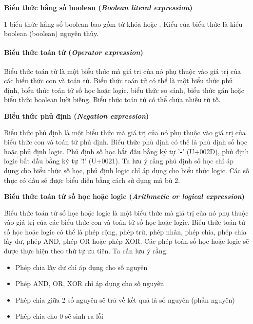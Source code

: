 \noindent\textbf{Biểu thức hằng số boolean (\textit{Boolean literal expression})}

1 biểu thức hằng số boolean bao gồm từ khóa  hoặc . Kiểu của biểu thức là kiểu boolean (boolean) nguyên thủy.

\paragraph{Biểu thức toán tử (\textit{Operator expression})}

\regexopexpr

Biểu thức toán tử là một biểu thức mà giá trị của nó phụ thuộc vào giá trị của các biểu thức con và toán tử. Biểu thức toán tử có thể là một biểu thức phủ định, biểu thức toán tử số học hoặc logic, biểu thức so sánh, biểu thức gán hoặc biểu thức boolean lười biếng. Biểu thức toán tử có thể chứa nhiều từ tố.

\noindent\textbf{Biểu thức phủ định (\textit{Negation expression})}

\regexneexpr

Biểu thức phủ định là một biểu thức mà giá trị của nó phụ thuộc vào giá trị của biểu thức con và toán tử phủ định. Biểu thức phủ định có thể là phủ định số học hoặc phủ định logic. Phủ định số học bắt đầu bằng ký tự '\textbf{-}' (U+002D), phủ định logic bắt đầu bằng ký tự '\textbf{!}' (U+0021). Ta lưu ý rằng phủ định số học chỉ áp dụng cho biểu thức số học, phủ định logic chỉ áp dụng cho biểu thức logic. Các số thực có dấu sẽ được biểu diễn bằng cách sử dụng mã bù 2.

\noindent\textbf{Biểu thức toán tử số học hoặc logic (\textit{Arithmetic or logical expression})}

\regexarithlogicexpr

Biểu thức toán tử số học hoặc logic là một biểu thức mà giá trị của nó phụ thuộc vào giá trị của các biểu thức con và toán tử số học hoặc logic. Biểu thức toán tử số học hoặc logic có thể là phép cộng, phép trừ, phép nhân, phép chia, phép chia lấy dư, phép AND, phép OR hoặc phép XOR. Các phép toán số học hoặc logic sẽ được thực hiện theo thứ tự ưu tiên. Ta cần lưu ý rằng:

\begin{itemize}
    \item{Phép chia lấy dư chỉ áp dụng cho số nguyên}
    \item{Phép AND, OR, XOR chỉ áp dụng cho số nguyên}
    \item{Phép chia giữa 2 số nguyên sẽ trả về kết quả là số nguyên (phần nguyên)}
    \item{Phép chia cho 0 sẽ sinh ra lỗi}           
\end{itemize}

